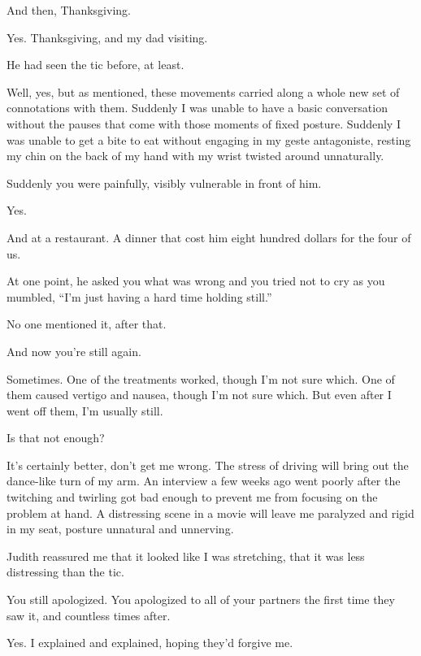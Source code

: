 \begin{paracol}{2}
\begin{leftcolumn}
\begin{ally}
And then, Thanksgiving.
\end{ally}
Yes. Thanksgiving, and my dad visiting.

\begin{ally}
He had seen the tic before, at least.
\end{ally}
Well, yes, but as mentioned, these movements carried along a whole new set of connotations with them. Suddenly I was unable to have a basic conversation without the pauses that come with those moments of fixed posture. Suddenly I was unable to get a bite to eat without engaging in my geste antagoniste, resting my chin on the back of my hand with my wrist twisted around unnaturally.

\begin{ally}
Suddenly you were painfully, visibly vulnerable in front of him.
\end{ally}
Yes.

And at a restaurant. A dinner that cost him eight hundred dollars for the four of us.

\begin{ally}
At one point, he asked you what was wrong and you tried not to cry as you mumbled, ``I'm just having a hard time holding still.''
\end{ally}
No one mentioned it, after that.
\newpage

\begin{ally}
And now you're still again.
\end{ally}
Sometimes. One of the treatments worked, though I'm not sure which. One of them caused vertigo and nausea, though I'm not sure which. But even after I went off them, I'm usually still.

\begin{ally}
Is that not enough?
\end{ally}
It's certainly better, don't get me wrong. The stress of driving will bring out the dance-like turn of my arm. An interview a few weeks ago went poorly after the twitching and twirling got bad enough to prevent me from focusing on the problem at hand. A distressing scene in a movie will leave me paralyzed and rigid in my seat, posture unnatural and unnerving.

Judith reassured me that it looked like I was stretching, that it was less distressing than the tic.

\begin{ally}
You still apologized. You apologized to all of your partners the first time they saw it, and countless times after.
\end{ally}
Yes. I explained and explained, hoping they'd forgive me.


\end{leftcolumn}
\end{paracol}
